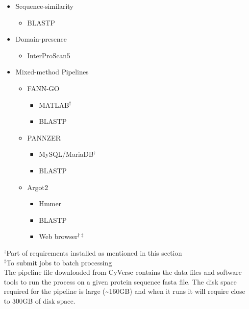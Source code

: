 \begin{itemize}
    \item Sequence-similarity
        \begin{itemize}
            \item BLASTP
        \end{itemize}
    \item Domain-presence
        \begin{itemize}
            \item InterProScan5
        \end{itemize}
    \item Mixed-method Pipelines
    \begin{itemize}
        \item FANN-GO
        \begin{itemize}
            \item MATLAB$^\dagger$  
            \item BLASTP
        \end{itemize}
        \item PANNZER
        \begin{itemize}
            \item MySQL/MariaDB$^\dagger$
            \item BLASTP
        \end{itemize}
        \item Argot2
        \begin{itemize}
            \item Hmmer
            \item BLASTP
            \item Web browser$^{\dagger\ddagger}$
        \end{itemize}
    \end{itemize}
\end{itemize}

$^\dagger$Part of requirements installed as mentioned in this section\\
$^\ddagger$To submit jobs to batch processing \\

The pipeline file downloaded from CyVerse contains the data files and software tools to run the process on a given protein sequence fasta file. The disk space required for the pipeline is large (\textasciitilde{}160GB) and when it runs it will require close to 300GB of disk space.